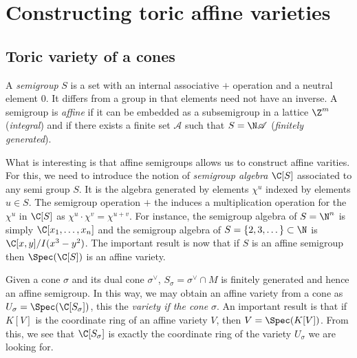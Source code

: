 \documentclass{worksheetclass}
\begin{document}
\section{Constructing toric affine varieties}

    \subsection{Toric variety of a cones}

        A \emph{semigroup} $S$ is a set with an internal associative $+$ operation and a neutral element $0$. It differs from a group in that elements need not have an inverse. A semigroup is \emph{affine} if it can be embedded as a subsemigroup in a lattice $\Z^m$ (\emph{integral}) and if there exists a finite set $\mathscr{A}$ such that $S=\N\mathscr{A}$ (\emph{finitely generated}). 
            
        What is interesting is that affine semigroups allows us to construct affine varities. For this, we need to introduce the notion of \emph{semigroup algebra} $\C[S]$ associated to any semi group $S$. It is the algebra generated by elements $\chi^u$ indexed by elements $u\in S$. The semigroup operation $+$ the induces a multiplication operation for the $\chi^u$ in $\C[S]$ as $\chi^u\cdot\chi^v=\chi^{u+v}$. For instance, the semigroup algebra of $S=\N^n$ is simply $\C[x_1,\dots,x_n]$ and the semigroup algebra of $S=\{2,3,\dots\}\subset\N$ is $\C[x,y]/I(x^3-y^2)$. The important result is now that if $S$ is an affine semigroup then $\Spec(\C[S])$ is an affine variety.

        Given a cone $\sigma$ and its dual cone $\sigma^\vee$, $S_\sigma=\sigma^\vee\cap M$ is finitely generated and hence an affine semigroup. In this way, we may obtain an affine variety from a cone as $U_\sigma=\Spec(\C[S_\sigma])$, this the \emph{variety if the cone} $\sigma$. An important result is that if $K[V]$ is the coordinate ring of an affine variety $V$, then $V=\Spec(K[V])$. From this, we see that $\C[S_\sigma]$ is exactly the coordinate ring of the variety $U_\sigma$ we are looking for.
        
\end{document}
